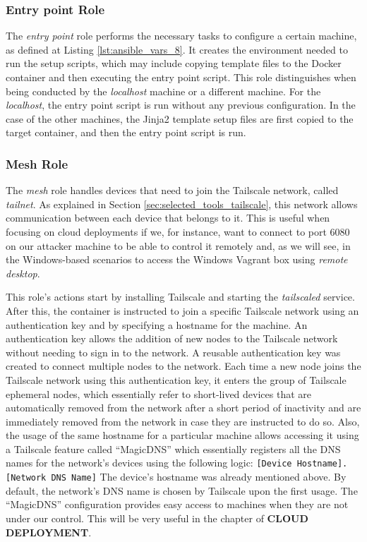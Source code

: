 \subsubsection{Entry point Role} \label{sec:ansible_entrypoint_role}

The \textit{entry point} role performs the necessary tasks to configure a certain machine, as defined at Listing \ref{lst:ansible_vars_8}. It creates the environment needed to run the setup scripts, which may include copying template files to the Docker container and then executing the entry point script. This role distinguishes when being conducted by the \textit{localhost} machine or a different machine. For the \textit{localhost}, the entry point script is run without any previous configuration. In the case of the other machines, the Jinja2 template setup files are first copied to the target container, and then the entry point script is run.

\subsubsection{Mesh Role} \label{sec:ansible_mesh_role}

The \textit{mesh} role handles devices that need to join the Tailscale network, called \textit{tailnet}. As explained in Section \ref{sec:selected_tools_tailscale}, this network allows communication between each device that belongs to it. This is useful when focusing on cloud deployments if we, for instance, want to connect to port 6080 on our attacker machine to be able to control it remotely and, as we will see, in the Windows-based scenarios to access the Windows Vagrant box using \textit{remote desktop}. 

This role's actions start by installing Tailscale and starting the \textit{tailscaled} service. After this, the container is instructed to join a specific Tailscale network using an authentication key and by specifying a hostname for the machine. An authentication key allows the addition of new nodes to the Tailscale network without needing to sign in to the network. A reusable authentication key was created to connect multiple nodes to the network. Each time a new node joins the Tailscale network using this authentication key, it enters the group of Tailscale ephemeral nodes, which essentially refer to short-lived devices that are automatically removed from the network after a short period of inactivity and are immediately removed from the network in case they are instructed to do so. Also, the usage of the same hostname for a particular machine allows accessing it using a Tailscale feature called ``MagicDNS'' which essentially registers all the DNS names for the network's devices using the following logic: \texttt{[Device Hostname].[Network DNS Name]}
The device's hostname was already mentioned above. By default, the network's DNS name is chosen by Tailscale upon the first usage. The ``MagicDNS'' configuration provides easy access to machines when they are not under our control. This will be very useful in the chapter of \textbf{CLOUD DEPLOYMENT}.

